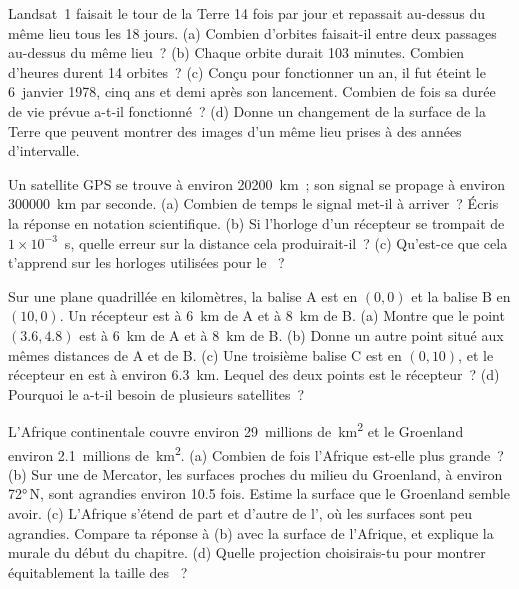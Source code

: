 \begin{exercise}[$\star\star$]\label{exo:g9:maps-of-the-earth:9}
Landsat~1 faisait le tour de la Terre 14 fois par jour et repassait
au-dessus du même lieu tous les 18 jours. (a) Combien d'orbites
faisait-il entre deux passages au-dessus du même lieu~? (b) Chaque orbite
durait 103 minutes. Combien d'heures durent 14 orbites~? (c) Conçu pour
fonctionner un an, il fut éteint le 6~janvier 1978, cinq ans et demi
après son lancement. Combien de fois sa durée de vie prévue a-t-il
fonctionné~? (d) Donne un changement de la surface de la Terre que
peuvent montrer des images d'un même lieu prises à des années
d'intervalle.
\end{exercise}

\begin{exercise}[$\star\star$]\label{exo:g9:maps-of-the-earth:10}
Un satellite GPS se trouve à environ \qty{20200}{km}~; son signal se
propage à environ \qty{300000}{km} par seconde. (a) Combien de temps le
signal met-il à arriver~? Écris la réponse en notation scientifique.
(b) Si l'horloge d'un récepteur se trompait de $1 \times 10^{-3}$~s,
quelle erreur sur la distance cela produirait-il~? (c) Qu'est-ce que cela
t'apprend sur les horloges utilisées pour le ~?
\end{exercise}

\begin{exercise}[$\star\star\star$]\label{exo:g9:maps-of-the-earth:11}
Sur une  plane quadrillée en kilomètres, la balise A est en $(0, 0)$
et la balise B en $(10, 0)$. Un récepteur est à \qty{6}{km} de A et à
\qty{8}{km} de B. (a) Montre que le point $(3.6, 4.8)$ est à \qty{6}{km} de A
et à \qty{8}{km} de B. (b) Donne un autre point situé aux mêmes distances
de A et de B. (c) Une troisième balise C est en $(0, 10)$, et le récepteur
en est à environ \qty{6.3}{km}. Lequel des deux points est le récepteur~?
(d) Pourquoi le  a-t-il besoin de plusieurs
satellites~?
\end{exercise}

\begin{exercise}[$\star\star\star$]\label{exo:g9:maps-of-the-earth:12}
L'Afrique continentale couvre environ 29~millions de~\unit{km^2} et le
Groenland environ 2.1~millions de~\unit{km^2}. (a) Combien de fois
l'Afrique est-elle plus grande~? (b) Sur une  de Mercator, les
surfaces proches du milieu du Groenland, à environ \ang{72}\,N, sont
agrandies environ 10.5 fois. Estime la surface que le Groenland semble
avoir. (c) L'Afrique s'étend de part et d'autre de l', où les
surfaces sont peu agrandies. Compare ta réponse à (b) avec la surface de
l'Afrique, et explique la  murale du début du chapitre. (d) Quelle
projection choisirais-tu pour montrer équitablement la taille des
~?
\end{exercise}

